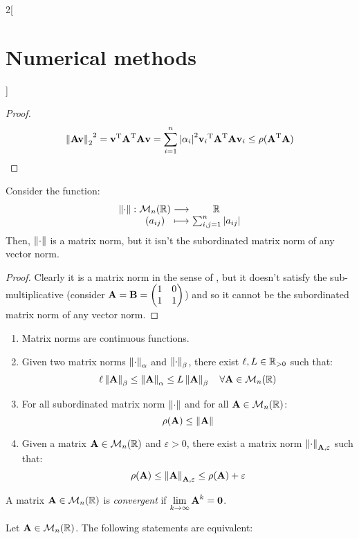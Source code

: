\documentclass[../../../main_math.tex]{subfiles}
\begin{document}
\begin{multicols}{2}[\section{Numerical methods}]
\begin{proof}
    $$
      {\left\|\boldsymbol{\mathrm{Av}}\right\|_2}^2={\boldsymbol{\mathrm{v}}}^{\mathrm{T}}{\boldsymbol{\mathrm{A}}}^{\mathrm{T}}\boldsymbol{\mathrm{A}}\boldsymbol{\mathrm{v}}=\sum_{i=1}^n\abs{\alpha_i}^2{\boldsymbol{\mathrm{v}}_i}^{\mathrm{T}}{\boldsymbol{\mathrm{A}}}^{\mathrm{T}}\boldsymbol{\mathrm{A}}\boldsymbol{\mathrm{v}}_i\leq \rho({\boldsymbol{\mathrm{A}}}^{\mathrm{T}}\boldsymbol{\mathrm{A}})
    $$
  \end{proof}
  \begin{proposition}
    Consider the function: $$\function{\norm{\cdot}}{\mathcal{M}_n(\RR)}{\RR}{(a_{ij})}{\sum_{i,j=1}^n\abs{a_{ij}}}$$ Then, $\left\|\cdot\right\|$ is a matrix norm, but it isn't the subordinated matrix norm of any vector norm.
  \end{proposition}
  \begin{proof}
    Clearly it is a matrix norm in the sense of , but it doesn't satisfy the sub-multiplicative (consider $\boldsymbol{\mathrm{A}}=\boldsymbol{\mathrm{B}}=\begin{pmatrix}
        1 & 0 \\ 1 & 1
      \end{pmatrix}$) and so it cannot be the subordinated matrix norm of any vector norm.
  \end{proof}
  \begin{proposition}
    \hfill
    \begin{enumerate}
      \item Matrix norms are continuous functions.
      \item Given two matrix norms $\left\|\cdot\right\|_\alpha$ and $\left\|\cdot\right\|_\beta$, there exist $\ell, L\in\mathbb{R}_{>0}$ such that: $$\ell \left\|\boldsymbol{\mathrm{A}}\right\|_\beta\leq\left\|\boldsymbol{\mathrm{A}}\right\|_\alpha\leq L\left\|\boldsymbol{\mathrm{A}}\right\|_\beta\quad\forall\boldsymbol{\mathrm{A}}\in\mathcal{M}_n(\mathbb{R})$$
      \item For all subordinated matrix norm $\left\|\cdot\right\|$ and for all $\boldsymbol{\mathrm{A}}\in\mathcal{M}_n(\mathbb{R})$: $$\rho(\boldsymbol{\mathrm{A}})\leq\left\|\boldsymbol{\mathrm{A}}\right\|$$
      \item Given a matrix $\boldsymbol{\mathrm{A}}\in\mathcal{M}_n(\mathbb{R})$ and $\varepsilon>0$, there exist a matrix norm $\left\|\cdot\right\|_{\boldsymbol{\mathrm{A}},\varepsilon}$ such that: $$\rho(\boldsymbol{\mathrm{A}})\leq\left\|\boldsymbol{\mathrm{A}}\right\|_{\boldsymbol{\mathrm{A}},\varepsilon}\leq\rho(\boldsymbol{\mathrm{A}})+\varepsilon$$
    \end{enumerate}
  \end{proposition}
  \begin{definition}
    A matrix $\boldsymbol{\mathrm{A}}\in\mathcal{M}_n(\mathbb{R})$ is \emph{convergent} if $\displaystyle\lim_{k\to\infty}\boldsymbol{\mathrm{A}}^k=\boldsymbol{\mathrm{0}}$.
  \end{definition}
  \begin{theorem}
    Let $\boldsymbol{\mathrm{A}}\in\mathcal{M}_n(\mathbb{R})$. The following statements are equivalent:
    \begin{enumerate}

\end{enumerate}
\end{theorem}
\end{multicols}
\end{document}
